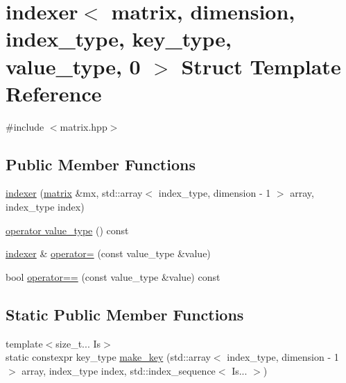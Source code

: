\hypertarget{structindexer_3_01matrix_00_01dimension_00_01index__type_00_01key__type_00_01value__type_00_010_01_4}{}\section{indexer$<$ matrix, dimension, index\+\_\+type, key\+\_\+type, value\+\_\+type, 0 $>$ Struct Template Reference}
\label{structindexer_3_01matrix_00_01dimension_00_01index__type_00_01key__type_00_01value__type_00_010_01_4}


{\ttfamily \#include $<$matrix.\+hpp$>$}

\subsection*{Public Member Functions}
\begin{DoxyCompactItemize}
\item 
\hyperlink{structindexer_3_01matrix_00_01dimension_00_01index__type_00_01key__type_00_01value__type_00_010_01_4_a4a847f124f20621aa9d0ef1f3eb2d7ed}{indexer} (\hyperlink{structmatrix}{matrix} \&mx, std\+::array$<$ index\+\_\+type, dimension -\/ 1 $>$ array, index\+\_\+type index)
\item 
\hyperlink{structindexer_3_01matrix_00_01dimension_00_01index__type_00_01key__type_00_01value__type_00_010_01_4_a9b7710fd28998876f2f8ce3ddb7ea7b8}{operator value\+\_\+type} () const
\item 
\hyperlink{structindexer}{indexer} \& \hyperlink{structindexer_3_01matrix_00_01dimension_00_01index__type_00_01key__type_00_01value__type_00_010_01_4_a4dcdfdf6a67aa42f35bbc768b6782586}{operator=} (const value\+\_\+type \&value)
\item 
bool \hyperlink{structindexer_3_01matrix_00_01dimension_00_01index__type_00_01key__type_00_01value__type_00_010_01_4_a68afd363480074d54a274cc4d55d806d}{operator==} (const value\+\_\+type \&value) const
\end{DoxyCompactItemize}
\subsection*{Static Public Member Functions}
\begin{DoxyCompactItemize}
\item 
{\footnotesize template$<$size\+\_\+t... Is$>$ }\\static constexpr key\+\_\+type \hyperlink{structindexer_3_01matrix_00_01dimension_00_01index__type_00_01key__type_00_01value__type_00_010_01_4_a41dc3fd53a532d010efe3073ac06f5ce}{make\+\_\+key} (std\+::array$<$ index\+\_\+type, dimension -\/ 1 $>$ array, index\+\_\+type index, std\+::index\+\_\+sequence$<$ Is... $>$)
\end{DoxyCompactItemize}


